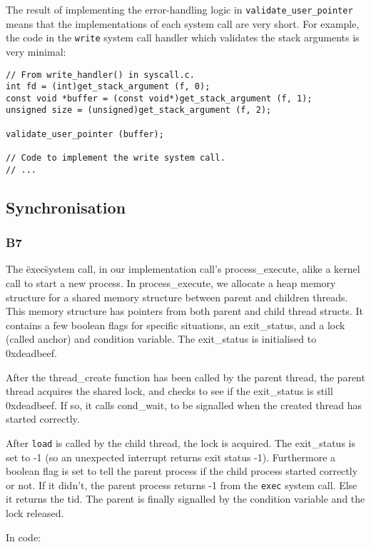 \documentclass[a4wide, 11pt]{article}
\newcommand{\tx}{\texttt}
\begin{document}
The result of implementing the error-handling logic in \tx{validate\_user\_pointer} means that the implementations of each system call are very short. For example, the code in the \tx{write} system call handler which validates the stack arguments is very minimal:

\begin{verbatim}
// From write_handler() in syscall.c.
int fd = (int)get_stack_argument (f, 0);
const void *buffer = (const void*)get_stack_argument (f, 1);
unsigned size = (unsigned)get_stack_argument (f, 2);

validate_user_pointer (buffer);

// Code to implement the write system call.
// ...
\end{verbatim}

\subsection{Synchronisation}
\subsubsection{B7}

The \"exec\" system call, in our implementation call's process\_execute, alike a kernel call to start a new process. In process\_execute, we allocate a heap memory structure for a shared memory structure between parent and children threads. This memory structure has pointers from both parent and child thread structs. It contains a few boolean flags for specific situations, an exit\_status, and a lock (called anchor) and condition variable. The exit\_status is initialised to 0xdeadbeef.

After the thread\_create function has been called by the parent thread, the parent thread acquires the shared lock, and checks to see if the exit\_status is still 0xdeadbeef. If so, it calls cond\_wait, to be signalled when the created thread has started correctly.

After \texttt{load} is called by the child thread, the lock is acquired. The exit\_status is set to -1 (so an unexpected interrupt returns exit status -1). Furthermore a boolean flag is set to tell the parent process if the child process started correctly or not. If it didn't, the parent process returns -1 from the \texttt{exec} system call. Else it returns the tid. The parent is finally signalled by the condition variable and the lock released.

In code:
\end{document}
